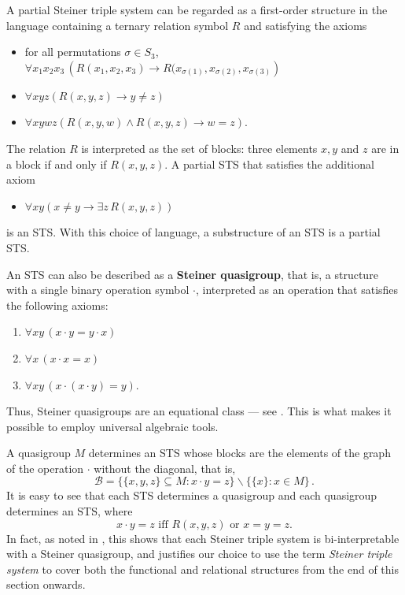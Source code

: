 \documentclass[10pt,a4paper]{article}
\theoremstyle{note}
\begin{document}
A  partial Steiner triple system can be regarded as a first-order structure in the language containing a ternary relation symbol $R$ and satisfying the axioms
\begin{itemize}
\item for all permutations $\sigma \in S_3$, $ \forall x_1 x_2 x_3 \, \left(R(x_1, x_2, x_3) \rightarrow R(x_{\sigma(1)}, x_{\sigma(2)}, x_{\sigma(3)} \right)$
\item $\forall x y z \left( R(x,y,z) \rightarrow y\neq z \right)$
\item $\forall x y w z \left( R(x,y,w) \wedge R(x,y,z) \rightarrow w=z \right)$.
\end{itemize}
The relation $R$ is interpreted as the set of blocks: three elements $x, y$ and $z$ are in a block if and only if $R(x,y,z)$.  A partial STS that satisfies the additional axiom
\begin{itemize}
\item $\forall x y \left( x \neq y \rightarrow \exists z \,R(x,y,z)\right)$
\end{itemize}
is an STS.
With this choice of language, a substructure of an STS is a partial STS.

An STS can also be described as a \textbf{Steiner quasigroup}, that is, a structure with a single binary operation symbol $\cdot$, interpreted as an operation that satisfies the following axioms:
 \begin{enumerate}
\item $\forall x y \, (x \cdot y= y\cdot x)$
\item $\forall x \, (x\cdot x =x)$
\item $\forall x y \, (x\cdot (x\cdot y)=y)$.
\end{enumerate}
Thus, Steiner quasigroups are an equational class --- see \cite{ganter1, ganter2}. This is what makes it possible to employ universal algebraic tools.

A quasigroup $M$ determines an STS whose blocks are the elements of the graph of the operation $\cdot$ without the diagonal, that is,
\[ \mathcal{B} = \{ \{x,y,z \} \subseteq M : x \cdot y = z \} \smallsetminus \{ \{x \} : x \in M \} \, .\]
It is easy to see that each STS determines a quasigroup and each quasigroup determines an STS, where
  $$x \cdot y = z \mbox{ iff } R(x,y,z) \mbox{ or } x=y=z.$$  In fact, as  noted in \cite{ganter1, ganter2}, this shows that each Steiner triple system is bi-interpretable with a Steiner quasigroup, and justifies our choice to use the term \textit{Steiner triple system} to cover both the functional and relational structures from the end of this section onwards.
\end{document}
